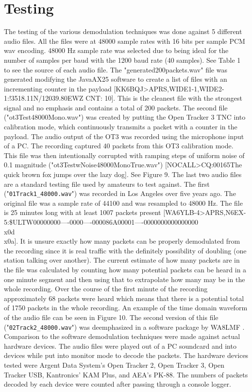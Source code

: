 \chapter{Testing}

The testing of the various demodulation techniques was done against 5 different audio files. All the files were at 48000 sample rates with 16 bits per sample PCM wav encoding. 48000 Hz sample rate was selected due to being ideal for the number of samples per baud with the 1200 baud rate (40 samples). See Table 1 to see the source of each audio file. The "generated200packets.wav" file was generated modifying the JavaAX25 software to create a list of files with an incrementing counter in the payload [KK6BQJ>APRS,WIDE1-1,WIDE2-1:!3518.11N/12039.80EWZ CNT: 10]. This is the cleanest file with the strongest signal and no emphasis and contains a total of 200 packets. The second file ("ot3Test48000Mono.wav") was created by putting the Open Tracker 3 TNC into calibration mode, which continuously transmits a packet with a counter in the payload. The audio output of the OT3 was recorded using the microphone input of a PC. The recording captured 40 packets from this OT3 calibration mode. This file was then intentionally corrupted with ramping steps of uniform noise of 0.1 magnitude ("ot3TestwNoise48000MonoTrue.wav") [NOCALL>CQ:00165The quick brown fox jumps over the lazy dog]. See Figure 9.  The last two audio files are a standard testing file used by amateurs to test against. The first ("\verb|01Track1_48000.wav|") was recorded in Los Angeles over five years ago. The original file was a sample rate of 44100 and was resampled to 48000 Hz. The file is 25 minutes long with at least 1007 packets present [WA6YLB-4>APRS,N6EX-5:\$ULTW00000000----0000----000086A00001----0000000000000000\\x0d\\x0a]. It is unsure exactly how many packets can be properly demodulated from the recording since it is real traffic with the definitely possibility of doubling (one station talking over another). The current estimate of how many packets are in the file was calculated by counting how many potential packets can be heard in a one minute segment and then using that to extrapolate how many may be in the whole recording. Over the course of the first minute of the recording approximately 68 packets were heard which means that there is a potential total of 1750 packets in the whole recording. An example of the time domain waveform of the audio file can be seen in Figure 10. The second version of this file ("\verb|02Track2_48000.wav|") was deemphasized in a software package by WA8LMF \cite{Smith2009}. Comparison to the software demodulation techniques were made against actual hardware devices. The audio files were played out of a PC soundcard and into devices while put into monitor mode to decode the packets. The hardware devices tested were Argent Data System's Open Tracker 2, Open Tracker 3, Open Tracker USB, Kantronics' KAM Plus, and AEA's PK-88. The numbers of packets decoded by each device were counted after passing through a console logger.

